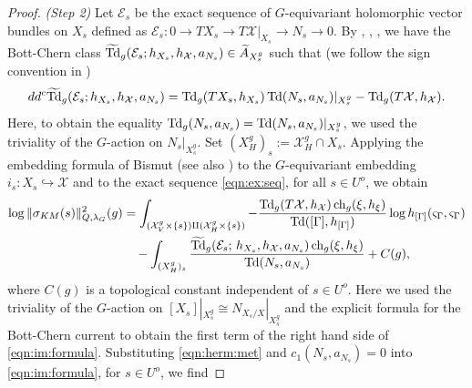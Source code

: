 \documentclass[amscd, leqno]{amsart}
\theoremstyle{plain}
\theoremstyle{definition}
\theoremstyle{remark}
\newenvironment{pf}{\begin{proof}}{\end{proof}}
\begin{document}
\begin{pf}
\par{\em (Step 2) }
Let ${\mathcal E}_{s}$ be the exact sequence of $G$-equivariant holomorphic vector bundles on $X_{s}$ 
defined as ${\mathcal E}_{s}\colon0\to TX_{s}\to T{\mathcal X}|_{X_{s}}\to N_{s}\to0$.
By \cite[I, Th.\,1.29]{BGS88}, \cite[Th.\,1.2.2]{GilletSoule90}, \cite[Th.\,3.4]{KohlerRoessler01}, we have the Bott-Chern class
$\widetilde{\rm Td}_{g}({\mathcal E}_{s};h_{X_{s}},h_{\mathcal X},a_{N_{s}})\in\widetilde{A}_{X^{g}_{s}}$ 
such that (we follow the sign convention in \cite{GilletSoule90})
$$
dd^{c}\widetilde{\rm Td}_{g}({\mathcal E}_{s};h_{X_{s}},h_{\mathcal X},a_{N_{s}})
=
{\rm Td}_{g}(TX_{s},h_{X_{s}})\,{\rm Td}(N_{s},a_{N_{s}})|_{X^{g}_{s}} - {\rm Td}_{g}(T{\mathcal X},h_{\mathcal X}).
$$
Here, to obtain the equality ${\rm Td}_{g}(N_{s},a_{N_{s}})={\rm Td}(N_{s},a_{N_{s}})|_{X_{s}^{g}}$, 
we used the triviality of the $G$-action on $N_{s}|_{X_{s}^{g}}$.
Set $(X_{H}^{g})_{s}:={\mathcal X}_{H}^{g}\cap X_{s}$.
Applying the embedding formula of Bismut \cite[Th.\,0.1]{Bismut95} (see also \cite[Th.\,5.6]{Bismut97}) to the $G$-equivariant embedding
$i_{s}\colon X_{s}\hookrightarrow{\mathcal X}$ and to the exact sequence \eqref{eqn:ex:seq}, for all $s\in U^{o}$, we obtain
\begin{equation}
\label{eqn:im:formula}
\begin{aligned}
\log\|\sigma_{KM}(s)\|^{2}_{Q,\lambda_{G}}(g)
&
=
\int_{({\mathcal X}^{g}_{V}\times\{s\})\amalg({\mathcal X}^{g}_{H}\times\{s\})}
-\frac{{\rm Td}_{g}(T{\mathcal X},h_{\mathcal X})\,{\rm ch}_{g}(\xi,h_{\xi})}{{\rm Td}([\Gamma],h_{[\Gamma]})} 
\log h_{[\Gamma]}(\varsigma_{\Gamma},\varsigma_{\Gamma})
\\
&
\quad
-\int_{(X^{g}_{H})_{s}} \frac{\widetilde{\rm Td}_{g} ({\mathcal E}_{s};\,h_{X_{s}},h_{\mathcal X},a_{N_{s}})\,
{\rm ch}_{g}(\xi,h_{\xi})}{{\rm Td}(N_{s},a_{N_{s}})} +C(g),
\end{aligned}
\end{equation}
where $C(g)$ is a topological constant independent of $s\in U^{o}$.
Here we used the triviality of the $G$-action on $[X_{s}]|_{X_{s}^{g}} \cong N_{X_{s}/X}|_{X_{s}^{g}}$ and the explicit formula for 
the Bott-Chern current \cite[Rem.\,3.5, especially (3.23), Th.\,3.15, Th.\,3.17]{BGS90} 
to obtain the first term of the right hand side of \eqref{eqn:im:formula}.
Substituting \eqref{eqn:herm:met} and $c_{1}(N_{s},a_{N_{s}})=0$ into \eqref{eqn:im:formula}, for $s\in U^{o}$, we find

\end{pf}
\end{document}
